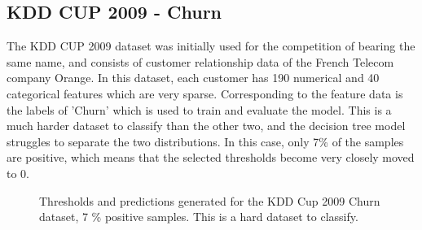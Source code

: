 \documentclass{article}
\begin{document}
\subsection{KDD CUP 2009 - Churn}
    The KDD CUP 2009 dataset was initially used for the competition of bearing the same name, and consists of customer relationship data of the French Telecom company Orange. In this dataset, each customer has 190 numerical and 40 categorical features which are very sparse. Corresponding to the feature data is the labels of 'Churn' which is used to train and evaluate the model. This is a much harder dataset to classify than the other two, and the decision tree model struggles to separate the two distributions. In this case, only 7\% of the samples are positive, which means that the selected thresholds become very closely moved to 0. 
\begin{figure}[H]
    \centering
    \scalebox{.8}{}
    \caption{Thresholds and predictions generated for the KDD Cup 2009 Churn dataset, 7 \% positive samples. This is a hard dataset to classify.}
\end{figure}



\end{document}
